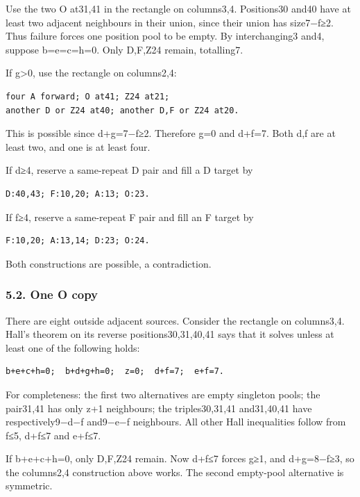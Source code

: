 \documentclass[
  10pt,
]{article}
\begin{document}
Use the two O at31,41 in the rectangle on columns3,4. Positions30 and40
have at least two adjacent neighbours in their union, since their union
has size7−f≥2. Thus failure forces one position pool to be empty. By
interchanging3 and4, suppose b=e=c=h=0. Only D,F,Z24 remain, totalling7.

If g\textgreater0, use the rectangle on columns2,4:

\begin{verbatim}
four A forward; O at41; Z24 at21;
another D or Z24 at40; another D,F or Z24 at20.
\end{verbatim}

This is possible since d+g=7−f≥2. Therefore g=0 and d+f=7. Both d,f are
at least two, and one is at least four.

If d≥4, reserve a same-repeat D pair and fill a D target by

\begin{verbatim}
D:40,43; F:10,20; A:13; O:23.
\end{verbatim}

If f≥4, reserve a same-repeat F pair and fill an F target by

\begin{verbatim}
F:10,20; A:13,14; D:23; O:24.
\end{verbatim}

Both constructions are possible, a contradiction.

\hypertarget{one-o-copy}{%
\subsubsection*{5.2. One O copy}\label{one-o-copy}}

There are eight outside adjacent sources. Consider the rectangle on
columns3,4. Hall's theorem on its reverse positions30,31,40,41 says that
it solves unless at least one of the following holds:

\begin{verbatim}
b+e+c+h=0;  b+d+g+h=0;  z=0;  d+f=7;  e+f=7.
\end{verbatim}

For completeness: the first two alternatives are empty singleton pools;
the pair31,41 has only z+1 neighbours; the triples30,31,41 and31,40,41
have respectively9−d−f and9−e−f neighbours. All other Hall inequalities
follow from f≤5, d+f≤7 and e+f≤7.

If b+e+c+h=0, only D,F,Z24 remain. Now d+f≤7 forces g≥1, and d+g=8−f≥3,
so the columns2,4 construction above works. The second empty-pool
alternative is symmetric.
\end{document}
